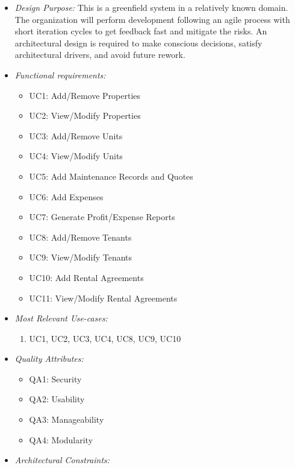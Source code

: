\documentclass[11pt]{article}
\begin{document}
    \begin{itemize}
        \item \textit{Design Purpose:} This is a greenfield system in a relatively known domain. The organization will perform development following an agile process with short iteration cycles to get feedback fast and mitigate the risks. An architectural design is required to make conscious decisions, satisfy architectural drivers, and avoid future rework.
        \item \textit{Functional requirements:}
            \begin{itemize}
                \item UC1: Add/Remove Properties
                \item UC2: View/Modify Properties 
                \item UC3: Add/Remove Units  
                \item UC4: View/Modify Units
                \item UC5: Add Maintenance Records and Quotes
                \item UC6: Add Expenses
                \item UC7: Generate Profit/Expense Reports
                \item UC8: Add/Remove Tenants
                \item UC9: View/Modify Tenants
                \item UC10: Add Rental Agreements
                \item UC11: View/Modify Rental Agreements
            \end{itemize}
        \item \textit{Most Relevant Use-cases:}
            \begin{enumerate}
                \item UC1, UC2, UC3, UC4, UC8, UC9, UC10
            \end{enumerate}
        \item \textit{Quality Attributes:}
            \begin{itemize}
                \item QA1: Security 
                \item QA2: Usability
                \item QA3: Manageability
                \item QA4: Modularity
            \end{itemize}
         \item \textit{Architectural Constraints:}

\end{itemize}
\end{document}
